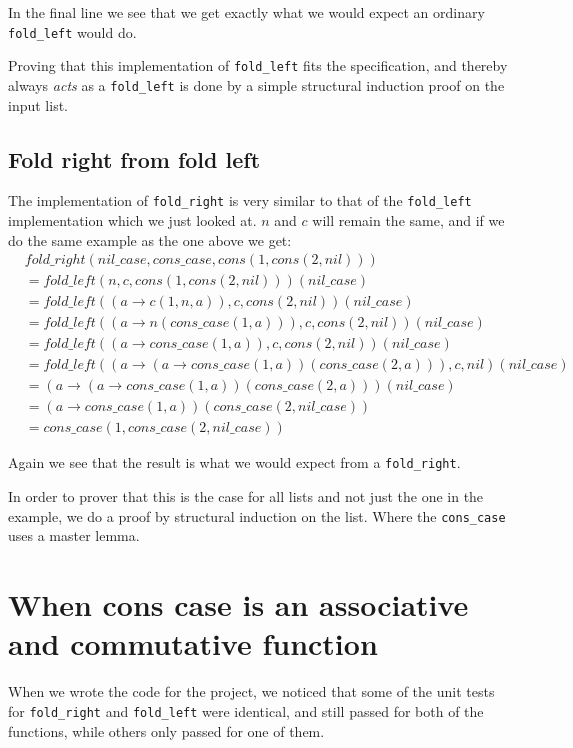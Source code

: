 \documentclass[a4paper]{article}
\begin{document}
In the final line we see that we get exactly what we would expect an ordinary
\texttt{fold\_left} would do.

Proving that this implementation of \texttt{fold\_left} fits the specification,
and thereby always \emph{acts} as a \texttt{fold\_left} is done by a simple
structural induction proof on the input list.

\subsection{Fold right from fold left}
The implementation of \texttt{fold\_right} is very similar to that of the
\texttt{fold\_left} implementation which we just looked at. $n$ and $c$ will
remain the same, and if we do the same example as the one above we get:
\begin{align*}
        &fold\_right(nil\_case, cons\_case, cons(1,cons(2, nil))) 
  \\ &= fold\_left(n, c, cons(1,cons(2, nil)))(nil\_case)
  \\ &= fold\_left((a \rightarrow c(1, n, a)), c, cons(2,nil))(nil\_case)
  \\ &= fold\_left((a \rightarrow n (cons\_case(1, a))), c, cons(2,nil))(nil\_case)
  \\ &= fold\_left((a \rightarrow cons\_case(1, a)), c, cons(2,nil))(nil\_case)
  \\ &= fold\_left((a \rightarrow (a \rightarrow 
  cons\_case(1,a))(cons\_case(2,a))), c, nil)(nil\_case)
  \\ &= (a \rightarrow (a \rightarrow
  cons\_case(1,a))(cons\_case(2,a)))(nil\_case)
  \\ &= (a \rightarrow cons\_case(1,a))(cons\_case(2, nil\_case))
  \\ &= cons\_case(1,cons\_case(2, nil\_case))
\end{align*}

Again we see that the result is what we would expect from a
\texttt{fold\_right}.

In order to prover that this is the case for all lists and not just the one in
the example, we do a proof by structural induction on the list. Where the
\texttt{cons\_case} uses a master lemma.

\section{When cons case is an associative and commutative function}
When we wrote the code for the project, we noticed that some of the unit tests
for \texttt{fold\_right} and \texttt{fold\_left} were identical, and still
passed for both of the functions, while others only passed for one of them.
\end{document}
